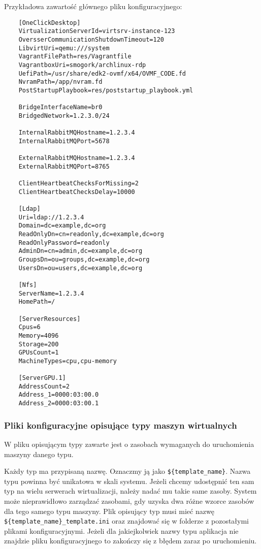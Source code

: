 \documentclass[../opis-rozwiazania.tex]{subfiles}
\begin{document}
Przykładowa zawartość głównego pliku konfiguracyjnego:
\begin{verbatim}
	[OneClickDesktop]
	VirtualizationServerId=virtsrv-instance-123
	OversserCommunicationShutdownTimeout=120
	LibvirtUri=qemu:///system
	VagrantFilePath=res/Vagrantfile
	VagrantboxUri=smogork/archlinux-rdp
	UefiPath=/usr/share/edk2-ovmf/x64/OVMF_CODE.fd
	NvramPath=/app/nvram.fd
	PostStartupPlaybook=res/poststartup_playbook.yml

	BridgeInterfaceName=br0
	BridgedNetwork=1.2.3.0/24

	InternalRabbitMQHostname=1.2.3.4
	InternalRabbitMQPort=5678

	ExternalRabbitMQHostname=1.2.3.4
	ExternalRabbitMQPort=8765

	ClientHeartbeatChecksForMissing=2
	ClientHeartbeatChecksDelay=10000

	[Ldap]
	Uri=ldap://1.2.3.4
	Domain=dc=example,dc=org
	ReadOnlyDn=cn=readonly,dc=example,dc=org
	ReadOnlyPassword=readonly
	AdminDn=cn=admin,dc=example,dc=org
	GroupsDn=ou=groups,dc=example,dc=org
	UsersDn=ou=users,dc=example,dc=org

	[Nfs]
	ServerName=1.2.3.4
	HomePath=/

	[ServerResources]
	Cpus=6
	Memory=4096
	Storage=200
	GPUsCount=1
	MachineTypes=cpu,cpu-memory

	[ServerGPU.1]
	AddressCount=2
	Address_1=0000:03:00.0
	Address_2=0000:03:00.1
\end{verbatim}

\subsubsection{Pliki konfiguracyjne opisujące typy maszyn wirtualnych}
W pliku opisującym typy zawarte jest o zasobach wymaganych do uruchomienia maszyny danego typu.

Każdy typ ma przypisaną nazwę. Oznaczmy ją jako \texttt{\$\{template\_name\}}.
Nazwa typu powinna być unikatowa w skali systemu.
Jeżeli chcemy udostępnić ten sam typ na wielu serwerach wirtualizacji, należy nadać mu takie same zasoby.
System może nieprawidłowo zarządzać zasobami, gdy uzyska dwa różne wzorce zasobów dla tego samego typu maszyny.
Plik opisujący typ musi mieć nazwę \texttt{\$\{template\_name\}\_template.ini} oraz znajdować się w folderze z pozostałymi plikami konfiguracyjnymi.
Jeżeli dla jakiejkolwiek nazwy typu aplikacja nie znajdzie pliku konfiguracyjnego to zakończy się z błędem zaraz po uruchomieniu.
\end{document}
